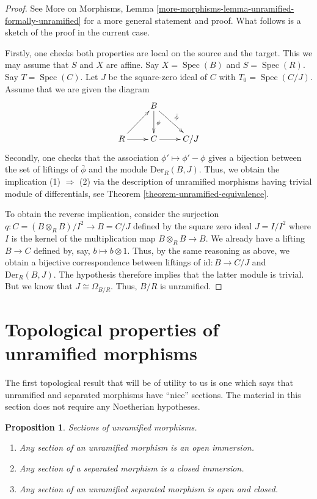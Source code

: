 \documentclass{stacks-project}
\theoremstyle{plain}
\newtheorem{proposition}[subsection]{Proposition}
\theoremstyle{definition}
\theoremstyle{remark}
\numberwithin{equation}{subsection}
\def\Spec{\mathop{\mathrm{Spec}}}
\begin{document}
\begin{proof}
See More on Morphisms,
Lemma \ref{more-morphisms-lemma-unramified-formally-unramified}
for a more general statement and proof.
What follows is a sketch of the proof in the current case.

\medskip\noindent
Firstly, one checks both properties are local on the source and the target.
This we may assume that $S$ and $X$ are affine.
Say $X = \Spec(B)$ and $S = \Spec(R)$.
Say $T = \Spec(C)$. Let $J$ be the square-zero ideal of $C$
with $T_0 = \Spec(C/J)$. Assume that we are given the diagram
$$
\xymatrix{
& B \ar[d]^\phi \ar[rd]^{\bar{\phi}}
& \\
R \ar[r] \ar[ur] & C \ar[r]
& C/J
}
$$
Secondly, one checks that the association $\phi' \mapsto \phi' - \phi$
gives a bijection between the set of liftings of $\bar{\phi}$ and the module
$\text{Der}_R(B, J)$. Thus, we obtain the implication (1) $\Rightarrow$ (2)
via the description of unramified morphisms having trivial module
of differentials, see Theorem \ref{theorem-unramified-equivalence}.

\medskip\noindent
To obtain the reverse implication, consider the surjection
$q : C = (B \otimes_R B)/I^2 \to B = C/J$ defined by the square zero ideal
$J = I/I^2$ where $I$ is the kernel of the multiplication map
$B \otimes_R B \to B$. We already have a lifting $B \to C$ defined by, say,
$b \mapsto b \otimes 1$. Thus, by the same reasoning as above, we obtain a
bijective correspondence between liftings of $\text{id} : B \to C/J$ and
$\text{Der}_R(B, J)$. The hypothesis therefore implies that the latter module is
trivial. But we know that $J \cong \Omega_{B/R}$. Thus, $B/R$ is unramified.
\end{proof}



\section{Topological properties of unramified morphisms}
\label{section-topological-unramified}

\noindent
The first topological result that will be of utility to us is one which says
that unramified and separated morphisms have ``nice'' sections.
The material in this section does not require any Noetherian hypotheses.

\begin{proposition}
\label{proposition-properties-sections}
Sections of unramified morphisms.
\begin{enumerate}
\item Any section of an unramified morphism is an open immersion.
\item Any section of a separated morphism is a closed immersion.
\item Any section of an unramified separated morphism is open and closed.
\end{enumerate}
\end{proposition}
\end{document}
